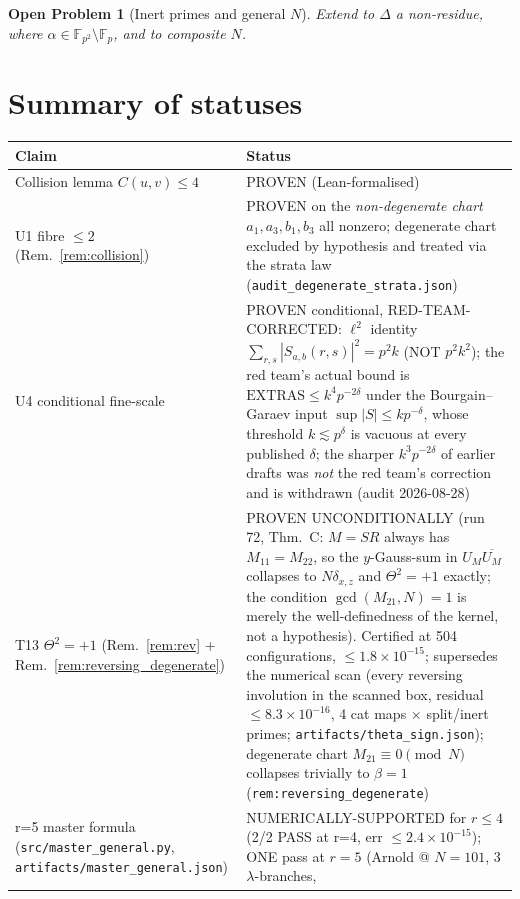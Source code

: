 \documentclass[11pt]{article}
\newtheorem{openproblem}[theorem]{Open Problem}
\begin{document}
\begin{openproblem}[Inert primes and general $N$]\label{op:inert}
Extend to $\Delta$ a non-residue, where
$\alpha\in\mathbb F_{p^2}\setminus\mathbb F_p$, and to composite $N$.
\end{openproblem}

\section{Summary of statuses}\label{sec:status}

\begin{center}
\begin{tabular}{ll}
\toprule
Claim & Status\\
\midrule
Collision lemma $C(u,v)\le4$ & PROVEN (Lean-formalised)\\
U1 fibre $\le 2$ (Rem.~\ref{rem:collision}) & PROVEN on the
\emph{non-degenerate chart}
$a_1,a_3,b_1,b_3$ all nonzero; degenerate chart
excluded by hypothesis and treated via the strata law
(\texttt{audit\_degenerate\_strata.json})\\
U4 conditional fine-scale & PROVEN conditional,
RED-TEAM-CORRECTED: $\ell^2$ identity
$\sum_{r,s}|S_{a,b}(r,s)|^2=p^2k$ (NOT $p^2k^2$);
the red team's actual bound is
$\mathrm{EXTRAS}\le k^4p^{-2\delta}$ under the Bourgain--Garaev
input $\sup|S|\le kp^{-\delta}$, whose threshold
$k\lesssim p^{\delta}$ is vacuous at every published $\delta$;
the sharper $k^3p^{-2\delta}$ of earlier drafts was \emph{not}
the red team's correction and is withdrawn (audit 2026-08-28)\\
T13 $\Theta^2=+1$ (Rem.~\ref{rem:rev} +
Rem.~\ref{rem:reversing_degenerate}) & PROVEN UNCONDITIONALLY (run 72, Thm.~C: $M=SR$ always has
$M_{11}=M_{22}$, so the $y$-Gauss-sum in $U_M\overline{U_M}$ collapses
to $N\delta_{x,z}$ and $\Theta^2=+1$ exactly; the condition
$\gcd(M_{21},N)=1$ is merely the well-definedness of the kernel, not a
hypothesis). Certified at 504 configurations, $\le1.8\times10^{-15}$;
supersedes the numerical scan (every
reversing involution in the scanned box, residual
$\le 8.3\times 10^{-16}$, 4 cat maps $\times$ split/inert
primes; \texttt{artifacts/theta\_sign.json});
degenerate chart $M_{21}\equiv 0\pmod N$ collapses
trivially to $\beta=1$ (\texttt{rem:reversing\_degenerate})\\
r=5 master formula
(\texttt{src/master\_general.py},
\texttt{artifacts/master\_general.json}) & NUMERICALLY-SUPPORTED
for $r\le 4$ (2/2 PASS at r=4, err $\le 2.4\times 10^{-15}$);
ONE pass at $r=5$ (Arnold @ $N{=}101$, 3 $\lambda$-branches,

\end{tabular}
\end{center}
\end{document}
